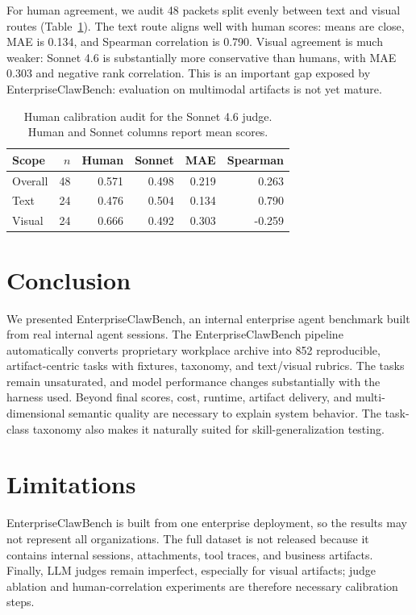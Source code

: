 \documentclass[11pt, a4paper, copyright, frontis]{frontis}
\newcommand{\ecb}{EnterpriseClawBench}
\newcommand{\ecbpipe}{EnterpriseClawBench pipeline}
\begin{document}
For human agreement, we audit 48 packets split evenly between text and visual routes (Table~\ref{ecblink:tab:human-judge}). The text route aligns well with human scores: means are close, MAE is 0.134, and Spearman correlation is 0.790. Visual agreement is much weaker: Sonnet 4.6 is substantially more conservative than humans, with MAE 0.303 and negative rank correlation. This is an important gap exposed by \ecb{}: evaluation on multimodal artifacts is not yet mature. 
\begin{table}[ht]
\centering
\small
\setlength{\tabcolsep}{3.6pt}
\begin{tabular}{lrrrrr}
\toprule
Scope & $n$ & Human & Sonnet & MAE & Spearman \\
\midrule
Overall & 48 & 0.571 & 0.498 & 0.219 & 0.263 \\
Text & 24 & 0.476 & 0.504 & 0.134 & 0.790 \\
Visual & 24 & 0.666 & 0.492 & 0.303 & -0.259 \\
\bottomrule
\end{tabular}
\caption{Human calibration audit for the Sonnet 4.6 judge. Human and Sonnet columns report mean scores.}
\label{ecblink:tab:human-judge}
\end{table}

\section{Conclusion}
We presented \ecb{}, an internal enterprise agent benchmark built from real internal agent sessions. The \ecbpipe{} automatically converts proprietary workplace archive into 852 reproducible, artifact-centric tasks with fixtures, taxonomy, and text/visual rubrics. The tasks remain unsaturated, and model performance changes substantially with the harness used. Beyond final scores, cost, runtime, artifact delivery, and multi-dimensional semantic quality are necessary to explain system behavior. The task-class taxonomy also makes it naturally suited for skill-generalization testing.



\section{Limitations}
\ecb{} is built from one enterprise deployment, so the results may not represent all organizations. The full dataset is not released because it contains internal sessions, attachments, tool traces, and business artifacts. Finally, LLM judges remain imperfect, especially for visual artifacts; judge ablation and human-correlation experiments are therefore necessary calibration steps.
\end{document}
